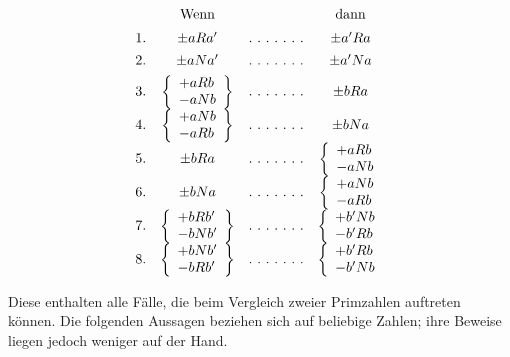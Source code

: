\[
\begin{array}{rccc}&\text{Wenn}&&\text{dann}\\[5pt]
1.&\pm aRa'&\mathinner{.\ .\ .\ .\ .\ .\ .}&\pm a' Ra\\[4pt]
2.&\pm aNa'&\mathinner{.\ .\ .\ .\ .\ .\ .}&\pm a' Na\\[4pt]
3.&\left\{\begin{array}{l}+aRb\\-aNb\end{array}\right\}&\mathinner{.\ .\ .\ .\ .\ .\ .}&\pm bRa\\[4pt]
4.&\left\{\begin{array}{l}+aNb\\-aRb\end{array}\right\}&\mathinner{.\ .\ .\ .\ .\ .\ .}&\pm bNa\\[4pt]
5.&\pm bRa&\mathinner{.\ .\ .\ .\ .\ .\ .}&\left\{\begin{array}{l}+aRb\\-aNb\end{array}\right.\\[4pt]
6.&\pm bNa&\mathinner{.\ .\ .\ .\ .\ .\ .}&\left\{\begin{array}{l}+aNb\\-aRb\end{array}\right.\\[4pt]
7.&\left\{\begin{array}{l}+bRb'\\-bNb'\end{array}\right\}&\mathinner{.\ .\ .\ .\ .\ .\ .}&\left\{\begin{array}{l}+b' Nb\\-b' Rb\end{array}\right.\\[4pt]
8.&\left\{\begin{array}{l}+bNb'\\-bRb'\end{array}\right\}&\mathinner{.\ .\ .\ .\ .\ .\ .}&\left\{\begin{array}{l}+b' Rb\\-b' Nb\end{array}\right.\\[4pt]
\end{array}
\]

Diese enthalten alle Fälle, die beim Vergleich zweier Primzahlen auftreten können. Die folgenden Aussagen beziehen sich auf beliebige Zahlen; ihre Beweise liegen jedoch weniger auf der Hand.

